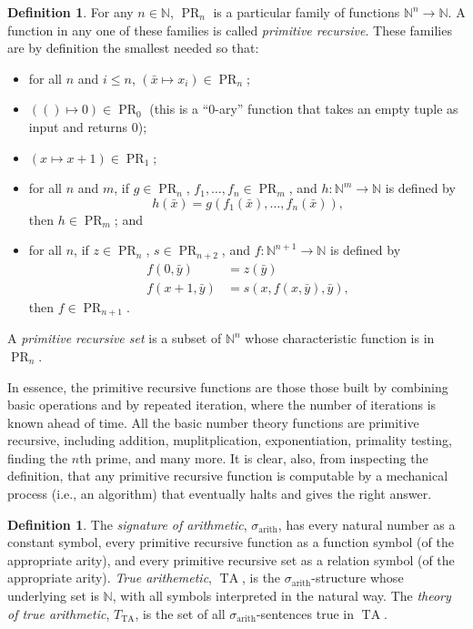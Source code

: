 \documentclass{article}
\theoremstyle{plain}
\theoremstyle{definition}
\newtheorem{defn}[thm]{Definition}
\newcommand{\defterm}{\emph}
\newcommand{\arithsig}{\sigma_{\operatorname{arith}}}
\newcommand{\tuple}{\bar}
\DeclareMathOperator{\PR}{PR}
\DeclareMathOperator{\TA}{TA}
\newcommand{\tathy}{T_{\TA}}
\begin{document}
\begin{defn}\label{defn:primrec}
  For any $n \in \mathbb{N}$, $\PR_n$ is a particular family of
  functions $\mathbb{N}^n \to \mathbb{N}$. A function in any one of
  these families is called \defterm{primitive recursive}. These
  families are by definition the smallest needed so that:
  \begin{itemize}
  \item for all $n$ and $i \leq n$, $\left(\tuple{x} \mapsto x_i\right) \in \PR_n$;
  \item $\left(() \mapsto 0\right) \in \PR_0$ (this is a ``0-ary''
    function that takes an empty tuple as input and returns 0);
  \item $\left(x \mapsto x + 1\right) \in \PR_1$;
  \item for all $n$ and $m$, if $g \in \PR_n$, $f_1,\ldots,f_n \in
    \PR_m$, and $h : \mathbb{N}^m \to \mathbb{N}$ is defined
    by $$h(\tuple{x}) =
    g(f_1(\tuple{x}),\ldots,f_n(\tuple{x}))\text{,}$$ then $h \in
    \PR_m$; and
  \item for all $n$, if $z \in \PR_n$, $s \in \PR_{n+2}$, and $f :
    \mathbb{N}^{n+1} \to \mathbb{N}$ is defined by
    \begin{align*}
      f(0,\tuple{y}) &= z(\tuple{y}) \\
      f(x+1,\tuple{y}) &= s(x,f(x,\tuple{y}),\tuple{y}) \text{,}
    \end{align*}
    then $f \in \PR_{n+1}$.
  \end{itemize}

  A \defterm{primitive recursive set} is a subset of $\mathbb{N}^n$
  whose characteristic function is in $\PR_n$.
\end{defn}

In essence, the primitive recursive functions are those those built by
combining basic operations and by repeated iteration, where the number
of iterations is known ahead of time. All the basic number theory
functions are primitive recursive, including addition,
muplitplication, exponentiation, primality testing, finding the $n$th
prime, and many more. It is clear, also, from inspecting the
definition, that any primitive recursive function is computable by a
mechanical process (i.e., an algorithm) that eventually halts and
gives the right answer.

\begin{defn}
  The \defterm{signature of arithmetic}, $\arithsig$, has every
  natural number as a constant symbol, every primitive recursive
  function as a function symbol (of the appropriate arity), and every
  primitive recursive set as a relation symbol (of the appropriate
  arity). \defterm{True arithemetic}, $\TA$, is the
  $\arithsig$-structure whose underlying set is $\mathbb{N}$, with all
  symbols interpreted in the natural way. The \defterm{theory of true
    arithmetic}, $\tathy$, is the set of all $\arithsig$-sentences
  true in $\TA$.
\end{defn}
\end{document}
